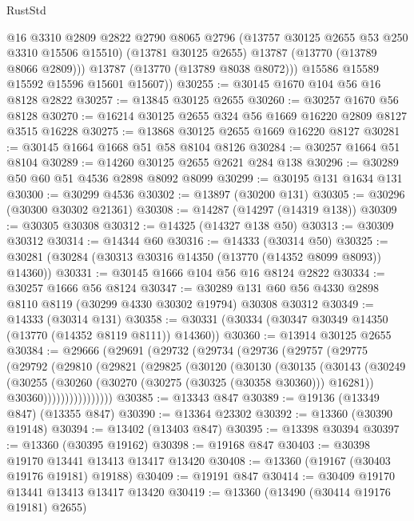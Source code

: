 \begin{lexlean}{RustStd}
\begin{coremodule}
            @16
            @3310
            @2809
            @2822
            @2790
            @8065
            @2796
            (@13757 @30125 @2655 @53 @250 @3310 @15506 @15510)
            (@13781 @30125 @2655)
            @13787
            (@13770 (@13789 @8066 @2809)))
          @13787
          (@13770 (@13789 @8038 @8072)))
        @15586
        @15589
        @15592
        @15596
        @15601
        @15607))
@30255 := @30145 @1670 @104 @56 @16 @8128 @2822
@30257 := @13845 @30125 @2655
@30260 := @30257 @1670 @56 @8128
@30270 := @16214 @30125 @2655 @324 @56 @1669 @16220 @2809 @8127 @3515 @16228
@30275 := @13868 @30125 @2655 @1669 @16220 @8127
@30281 := @30145 @1664 @1668 @51 @58 @8104 @8126
@30284 := @30257 @1664 @51 @8104
@30289 := @14260 @30125 @2655 @2621 @284 @138
@30296 := @30289 @50 @60 @51 @4536 @2898 @8092 @8099
@30299 := @30195 @131 @1634 @131
@30300 := @30299 @4536
@30302 := @13897 (@30200 @131)
@30305 := @30296 (@30300 @30302 @21361)
@30308 := @14287 (@14297 (@14319 @138))
@30309 := @30305 @30308
@30312 := @14325 (@14327 @138 @50)
@30313 := @30309 @30312
@30314 := @14344 @60
@30316 := @14333 (@30314 @50)
@30325 := @30281 (@30284 (@30313 @30316 @14350 (@13770 (@14352 @8099 @8093)) @14360))
@30331 := @30145 @1666 @104 @56 @16 @8124 @2822
@30334 := @30257 @1666 @56 @8124
@30347 := @30289 @131 @60 @56 @4330 @2898 @8110 @8119 (@30299 @4330 @30302 @19794) @30308 @30312
@30349 := @14333 (@30314 @131)
@30358 := @30331 (@30334 (@30347 @30349 @14350 (@13770 (@14352 @8119 @8111)) @14360))
@30360 := @13914 @30125 @2655
@30384 := @29666
    (@29691
      (@29732
        (@29734
          (@29736
            (@29757
              (@29775
                (@29792
                  (@29810
                    (@29821
                      (@29825
                        (@30120
                          (@30130
                            (@30135
                              (@30143
                                (@30249
                                  (@30255
                                    (@30260 (@30270 (@30275 (@30325 (@30358 @30360))) @16281))
                                    @30360))))))))))))))))
@30385 := @13343 @847
@30389 := @19136 (@13349 @847) (@13355 @847)
@30390 := @13364 @23302
@30392 := @13360 (@30390 @19148)
@30394 := @13402 (@13403 @847)
@30395 := @13398 @30394
@30397 := @13360 (@30395 @19162)
@30398 := @19168 @847
@30403 := @30398 @19170 @13441 @13413 @13417 @13420
@30408 := @13360 (@19167 (@30403 @19176 @19181) @19188)
@30409 := @19191 @847
@30414 := @30409 @19170 @13441 @13413 @13417 @13420
@30419 := @13360 (@13490 (@30414 @19176 @19181) @2655)

\end{coremodule}
\end{lexlean}
